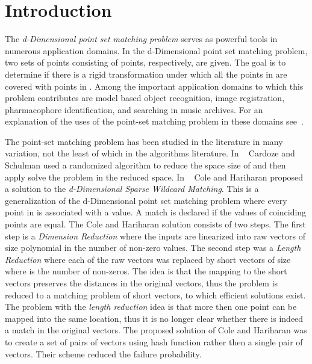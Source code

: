\documentclass[11pt,amssymb]{article}
\begin{document}
\setlength{\parindent}{0.0in}
\setlength{\parskip}{0.1 in}

\section{Introduction\label{sec:intro}}

The {\em  d-Dimensional point set matching problem} serves as powerful
tools in numerous application domains.
In the d-Dimensional point set matching problem, two sets of points
 consisting of  points, respectively, are given.
The goal is to determine if there is a rigid transformation under
which all the points in  are covered with points in . Among the
important application domains to which this problem contributes are
model based object recognition, image registration, pharmacophore
identification, and searching in music archives. For an explanation of
the uses of the point-set matching problem in these domains
see~\cite{LR07}.

The point-set matching problem has been studied in the literature in
many variation,  not the least of which in the
algorithms literature. In ~\cite{sc:98Sch} Cardoze and Schulman used a
randomized algorithm to reduce the space size of  and then
apply solve the problem in the reduced
space. In ~\cite{CH:02} Cole and Hariharan proposed a solution to
the {\it d-Dimensional Sparse Wildcard Matching}. This is a
generalization of the d-Dimensional point set matching problem where
every point in  is associated with a value. A match is declared
if the values of coinciding points are equal. The Cole and Hariharan
solution consists of two steps. The first step is a {\it Dimension
Reduction} where the inputs  are linearized into raw vectors
 of size polynomial in the number of non-zero values. The
second step was a {\it Length Reduction} where each of the raw vectors
 was replaced by  short vectors of size  where
 is the number of non-zeros. The idea is that the mapping to the
short vectors preserves the distances in the original vectors, thus
the problem is reduced to a matching problem of short vectors, to
which efficient solutions exist. The problem with the {\em length
reduction} idea is that more then one point can be mapped into the
same location, thus it is no longer clear whether there is indeed a
match in the original vectors. The proposed solution of Cole and
Hariharan was to create a set of  pairs of vectors using
 hash function rather then a single pair of vectors. Their
scheme reduced the failure probability.
\end{document}
